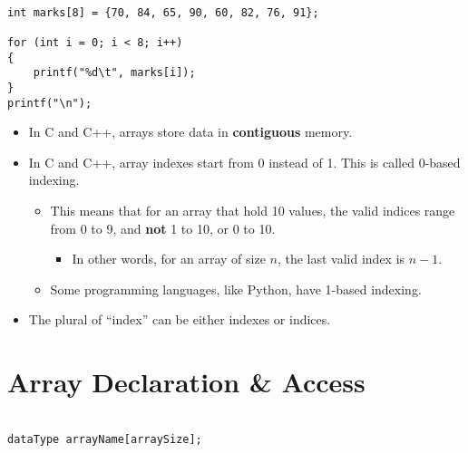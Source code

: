 \documentclass[12pt]{article}
\begin{document}
\begin{verbatim}
	
int marks[8] = {70, 84, 65, 90, 60, 82, 76, 91};

for (int i = 0; i < 8; i++)
{
    printf("%d\t", marks[i]);
}
printf("\n");

\end{verbatim}

\vspace{1cm}

\begin{itemize}
    \item In C and C++, arrays store data in \textbf{contiguous} memory.
    \item In C and C++, array indexes start from 0 instead of 1. This is called 0-based indexing.
    
    \begin{itemize}
        \item This means that for an array that hold 10 values, the valid indices range from 0 to 9, and \textbf{not} 1 to 10, or 0 to 10.
        
        \begin{itemize}
            \item In other words, for an array of size $n$, the last valid index is $n - 1$.
        \end{itemize}

        \item Some programming languages, like Python, have 1-based indexing.
    \end{itemize}

    \item The plural of ``index'' can be either indexes or indices.

\end{itemize}











\newpage
{}
\section*{Array Declaration \& Access}

\begin{verbatim}
	
dataType arrayName[arraySize];

\end{verbatim}
\end{document}
